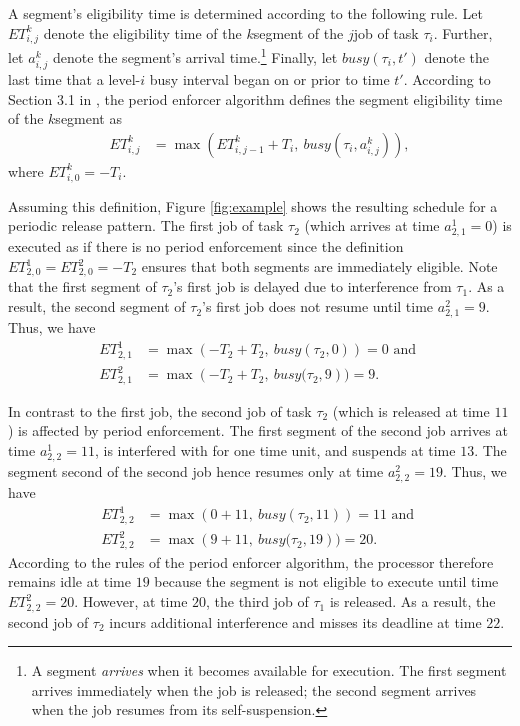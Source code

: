 A segment's eligibility time is determined according to the following rule. Let $ET_{i,j}^k$ denote the eligibility time of the $k$\xth segment of the $j$\xth job of task $\tau_i$. Further, let $a^k_{i,j}$ denote the segment's arrival time.\footnote{A segment \emph{arrives} when it becomes available for execution. The first segment arrives immediately when the job is released; the second segment arrives when the job resumes from its self-suspension.} Finally, let $\mathit{busy}(\tau_i, t')$ denote the last time that a level-$i$ busy interval began on or prior to time $t'$. According to Section 3.1 in \cite{Raj:suspension1991}, the period enforcer algorithm defines the segment eligibility time of the $k$\xth segment as
\begin{align}\label{eq:ET-def}
	ET_{i,j}^k & = \max\left(ET_{i,j-1}^k + T_i,\ \mathit{busy}(\tau_i, a^k_{i,j})\right),
\end{align}
where $ET_{i,0}^k = -T_i$. 

Assuming this definition, Figure \ref{fig:example} shows the resulting schedule for a periodic release pattern. The first job of task $\tau_2$ (which arrives at time $a^1_{2,1} =  0$) is executed as if there is no period enforcement since the definition $ET_{2,0}^1 = ET_{2,0}^2 = -T_2$ ensures that both segments are immediately eligible. Note that the first segment of $\tau_2$'s first job is delayed due to interference from $\tau_1$. As a result, the second segment of $\tau_2$'s first job does not resume until time $a^2_{2,1} = 9$. Thus, we have
\begin{align*}
	ET_{2,1}^1 & = \max\left(-T_2 + T_2,\ \mathit{busy}(\tau_2, 0)\right) = 0  \text{ and }
\\
	ET_{2,1}^2 & = \max\left(-T_2 + T_2,\ \mathit{busy}(\tau_2, 9\right) ) = 9.
\end{align*}

In contrast to the first job, the second job of task $\tau_2$ (which is released at time $11$) is affected by period enforcement. The first segment of the second job arrives at time $a^1_{2,2} = 11$, is interfered with for one time unit, and suspends at time $13$. The segment second of the second job hence resumes only at time $a^2_{2,2} = 19$. Thus, we have
\begin{align*}
	ET_{2,2}^1 & = \max\left(0 + 11,\ \mathit{busy}(\tau_2, 11)\right) = 11  \text{ and }
\\
	ET_{2,2}^2 & = \max\left(9 + 11,\ \mathit{busy}(\tau_2, 19\right) ) = 20.
\end{align*}
According to the rules of the period enforcer algorithm, the processor therefore remains idle at time $19$ because the segment is not eligible to execute until time $ET_{2,2}^2 = 20$. However, at time $20$, the third job of $\tau_1$ is released. As a result, the second job of $\tau_2$ incurs additional interference and misses its deadline at time $22$.




